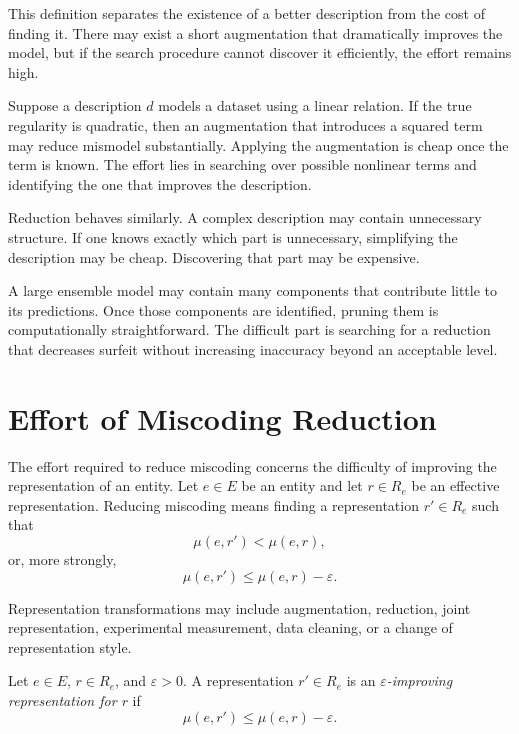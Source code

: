 This definition separates the existence of a better description from the cost of finding it. There may exist a short augmentation that dramatically improves the model, but if the search procedure cannot discover it efficiently, the effort remains high.

\begin{example}
Suppose a description \(d\) models a dataset using a linear relation. If the true regularity is quadratic, then an augmentation that introduces a squared term may reduce mismodel substantially. Applying the augmentation is cheap once the term is known. The effort lies in searching over possible nonlinear terms and identifying the one that improves the description.
\end{example}

Reduction behaves similarly. A complex description may contain unnecessary structure. If one knows exactly which part is unnecessary, simplifying the description may be cheap. Discovering that part may be expensive.

\begin{example}
A large ensemble model may contain many components that contribute little to its predictions. Once those components are identified, pruning them is computationally straightforward. The difficult part is searching for a reduction that decreases surfeit without increasing inaccuracy beyond an acceptable level.
\end{example}

\section{Effort of Miscoding Reduction}
\label{sec:effort_miscoding_reduction}

The effort required to reduce miscoding concerns the difficulty of improving the representation of an entity. Let \(e\in E\) be an entity and let \(r\in R_e\) be an effective representation. Reducing miscoding means finding a representation \(r'\in R_e\) such that
\[
\mu(e,r')<\mu(e,r),
\]
or, more strongly,
\[
\mu(e,r')\leq \mu(e,r)-\varepsilon.
\]

Representation transformations may include augmentation, reduction, joint representation, experimental measurement, data cleaning, or a change of representation style.

\begin{definition}
Let \(e\in E\), \(r\in R_e\), and \(\varepsilon>0\). A representation \(r'\in R_e\) is an \emph{\(\varepsilon\)-improving representation for \(r\)} if
\[
\mu(e,r')\leq \mu(e,r)-\varepsilon.
\]
\end{definition}

